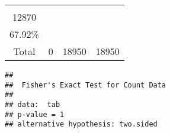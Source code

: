 \documentclass[]{article}
\begin{document}
\begin{longtable}[]{@{}cccc@{}}
\begin{minipage}[t]{0.12\columnwidth}
~\\
12870\\
67.92\%\strut
\end{minipage}\tabularnewline
\begin{minipage}[t]{0.28\columnwidth}\centering\strut
Total\strut
\end{minipage} & \begin{minipage}[t]{0.23\columnwidth}\centering\strut
0\strut
\end{minipage} & \begin{minipage}[t]{0.25\columnwidth}\centering\strut
18950\strut
\end{minipage} & \begin{minipage}[t]{0.12\columnwidth}\centering\strut
18950\strut
\end{minipage}\tabularnewline
\bottomrule
\end{longtable}

\begin{verbatim}
## 
##  Fisher's Exact Test for Count Data
## 
## data:  tab
## p-value = 1
## alternative hypothesis: two.sided
\end{verbatim}
\end{document}
